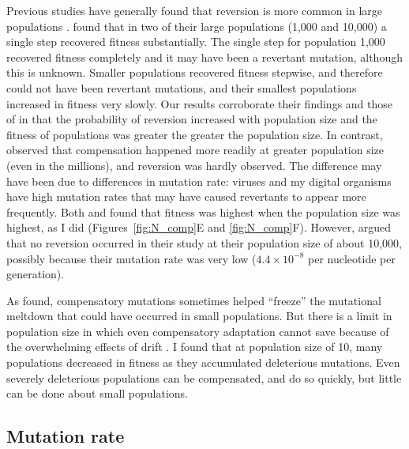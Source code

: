 \begin{doublespace}
Previous studies have generally found that reversion is more common
in large populations \citep{bur99,arg07}.
%
\citet{bur99} found that in two of their large populations
(1,000 and 10,000) a single step recovered fitness substantially.
%
The single step for population 1,000 recovered fitness completely
and it may have been a revertant mutation, although this is unknown.
%
Smaller populations recovered fitness stepwise, and therefore
could not have been revertant mutations,
and their smallest populations increased in fitness very slowly.
%
Our results corroborate their findings and
those of \citet{san05} in that
the probability of reversion increased with population size
and the fitness of populations was greater the greater the population size.
%
In contrast, \citet{mai02} observed that
compensation happened more readily at greater population size
(even in the millions), and reversion was hardly observed.
%
The difference may have been due to differences in mutation rate:
viruses and my digital organisms have high mutation rates
that may have caused revertants to appear more frequently.
%
Both \citet{bur99} and \citet{mai02}
found that fitness was highest when the population size was highest,
as I did (Figures~\ref{fig:N_comp}E and \ref{fig:N_comp}F).
%
However, \citet{est03} argued that no reversion occurred in their
study at their population size of about 10,000, possibly because their mutation
rate was very low ($4.4 \times 10^{-8}$ per nucleotide per generation).



As \citet{poo00} found, compensatory mutations sometimes helped ``freeze''
the mutational meltdown that could have occurred in small populations.
%
But there is a limit in population size in which even compensatory adaptation
cannot save because of the overwhelming effects of drift \citep{poo05}.
%
I found that at population size of 10, many populations decreased in fitness
as they accumulated deleterious mutations.
%
Even severely deleterious populations can be compensated, and do so quickly,
but little can be done about small populations.



\subsection{Mutation rate}


\end{doublespace}
